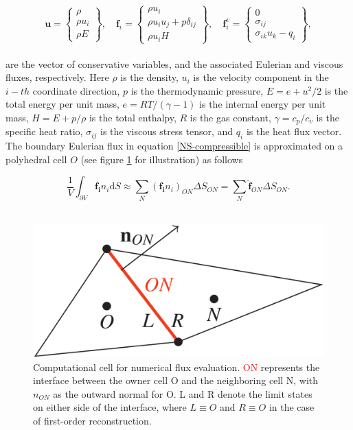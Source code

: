 \documentclass[a5paper]{sapthesis}
\begin{document}
	\begin{equation}
	\mathbf{u} =
	\begin{Bmatrix} 
		\rho \\ 
		\rho u_i \\ 
		\rho E 
	\end{Bmatrix}, \quad
	\mathbf{f}_i =
	\begin{Bmatrix} 
		\rho u_i \\ 
		\rho u_i u_j + p \delta_{ij} \\ 
		\rho u_i H 
	\end{Bmatrix}, \quad
	\mathbf{f}_i^v =
	\begin{Bmatrix} 
		0 \\ 
		\sigma_{ij} \\ 
		\sigma_{ik} u_k - q_i 
	\end{Bmatrix},
	\label{variables}
	\end{equation}
	\\
	are the vector of conservative variables, and the associated Eulerian and viscous fluxes, respectively. Here $\rho$ is the density, $ u_i$ is the velocity component in the $i-th$ coordinate direction, $p$ is the thermodynamic pressure, $ E = e + u^2/2 $ is the total energy per unit mass, $ e = RT/(\gamma - 1) $ is the internal energy per unit mass, $ H = E + p/\rho $ is the total enthalpy, $ R $ is the gas constant, $ \gamma = c_p/c_v $ is the specific heat ratio, $ \sigma_{ij} $ is the viscous stress tensor, and $ q_i $ is the heat flux vector.
	\\
	The boundary Eulerian flux in equation \ref{NS-compressible} is approximated on a polyhedral cell $ O $ (see figure \ref{figure:cells} for illustration) as follows
	
	\begin{equation}
		\frac{1}{V} \int_{\partial V} \mathbf{f_i} n_i \mathrm{d}S \approx \sum_N (\mathbf{f_i} n_i)_{ON} \Delta S_{ON} = \sum_N \mathbf{\hat{f}}_{ON} \Delta S_{ON}.
	\end{equation}
	\\
	\begin{figure}[h]
		\centering
		\includegraphics[width=0.4 \linewidth]{Figures/CELL.png}
		\caption[2D computational cell for numerical flux evaluation.]{Computational cell for numerical flux evaluation. \textcolor{red}{ON} represents the interface between the owner cell O and the neighboring cell N, with $n_{ON}$ as the outward normal for O. L and R denote the limit states on either side of the interface, where $L\equiv O$ and $R \equiv O$ in the case of first-order reconstruction.}
		\label{figure:cells}
	\end{figure} 
	
\end{document}
